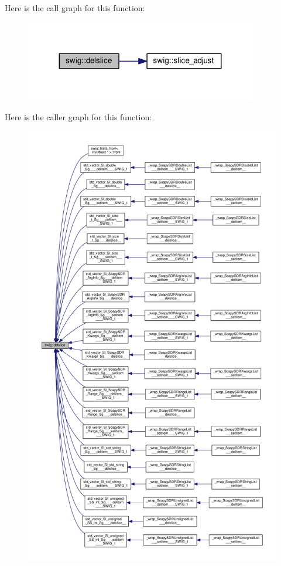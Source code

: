 Here is the call graph for this function\+:
\nopagebreak
\begin{figure}[H]
\begin{center}
\leavevmode
\includegraphics[width=287pt]{d3/d99/namespaceswig_a9d3d629d8459e58b1e78a5a1ff378bf0_cgraph}
\end{center}
\end{figure}




Here is the caller graph for this function\+:
\nopagebreak
\begin{figure}[H]
\begin{center}
\leavevmode
\includegraphics[height=550pt]{d3/d99/namespaceswig_a9d3d629d8459e58b1e78a5a1ff378bf0_icgraph}
\end{center}
\end{figure}


